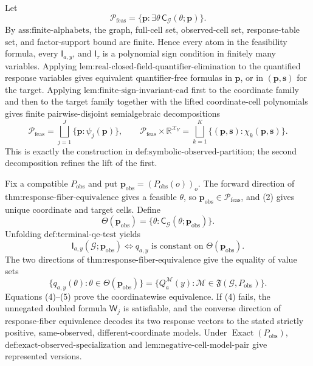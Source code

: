 Let
\[
\mathcal P_{\mathrm{feas}}
=\{\mathbf p:\exists\theta\,\mathsf C_{\mathcal G}(\theta;\mathbf p)\}.
\tag{1}
\]
By \(\text{ass:finite-alphabets}\), the graph, full-cell set, observed-cell set, response-table set, and factor-support bound are finite. Hence every atom in the feasibility formula, every \(\mathsf I_{a,y}\), and \(\mathsf I_{\tau}\) is a polynomial sign condition in finitely many variables. Applying \(\text{lem:real-closed-field-quantifier-elimination}\) to the quantified response variables gives equivalent quantifier-free formulas in \(\mathbf p\), or in \((\mathbf p,\mathbf s)\) for the target. Applying \(\text{lem:finite-sign-invariant-cad}\) first to the coordinate family and then to the target family together with the lifted coordinate-cell polynomials gives finite pairwise-disjoint semialgebraic decompositions
\[
\mathcal P_{\mathrm{feas}}
=\bigsqcup_{j=1}^{J}\{\mathbf p:\psi_j(\mathbf p)\},
\qquad
\mathcal P_{\mathrm{feas}}\times\mathbb R^{\mathcal X_Y}
=\bigsqcup_{k=1}^{K}\{(\mathbf p,\mathbf s):\chi_k(\mathbf p,\mathbf s)\}.
\tag{2}
\]
This is exactly the construction in \(\text{def:symbolic-observed-partition}\); the second decomposition refines the lift of the first.

Fix a compatible \(P_{\mathrm{obs}}\) and put \(\mathbf p_{\mathrm{obs}}=(P_{\mathrm{obs}}(o))_o\). The forward direction of \(\text{thm:response-fiber-equivalence}\) gives a feasible \(\theta\), so \(\mathbf p_{\mathrm{obs}}\in\mathcal P_{\mathrm{feas}}\), and (2) gives unique coordinate and target cells. Define
\[
\Theta(\mathbf p_{\mathrm{obs}})
=\{\theta:\mathsf C_{\mathcal G}(\theta;\mathbf p_{\mathrm{obs}})\}.
\tag{3}
\]
Unfolding \(\text{def:terminal-qe-test}\) yields
\[
\mathsf I_{a,y}(\mathcal G;\mathbf p_{\mathrm{obs}})
\Longleftrightarrow
q_{a,y}\text{ is constant on }\Theta(\mathbf p_{\mathrm{obs}}).
\tag{4}
\]
The two directions of \(\text{thm:response-fiber-equivalence}\) give the equality of value sets
\[
\{q_{a,y}(\theta):\theta\in\Theta(\mathbf p_{\mathrm{obs}})\}
=\{Q_a^{\mathcal M}(y):\mathcal M\in\mathfrak F(\mathcal G,P_{\mathrm{obs}})\}.
\tag{5}
\]
Equations (4)--(5) prove the coordinatewise equivalence. If (4) fails, the unnegated doubled formula \(\mathsf W_j\) is satisfiable, and the converse direction of response-fiber equivalence decodes its two response vectors to the stated strictly positive, same-observed, different-coordinate models. Under \(\operatorname{Exact}(P_{\mathrm{obs}})\), \(\text{def:exact-observed-specialization}\) and \(\text{lem:negative-cell-model-pair}\) give represented versions.

